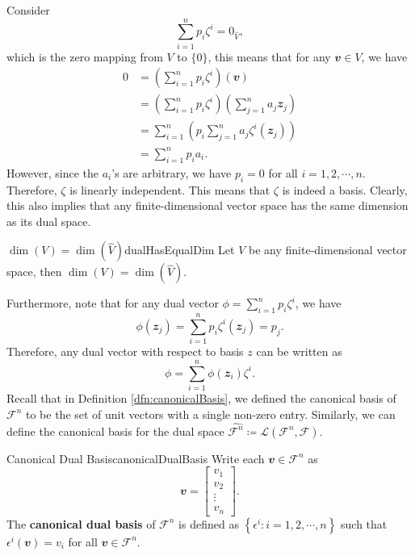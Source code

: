 \documentclass[math, code]{amznotes}
\theoremstyle{remark}
\begin{document}
Consider
\begin{equation*}
    \sum_{i = 1}^{n}p_i\zeta^i = 0_{\hat{V}},
\end{equation*}
which is the zero mapping from $V$ to $\{0\}$, this means that for any $\mathbfit{v} \in V$, we have
\begin{align*}
    0 & = \left(\sum_{i = 1}^{n}p_i\zeta^i\right)(\mathbfit{v}) \\
    & = \left(\sum_{i = 1}^{n}p_i\zeta^i\right)\left(\sum_{j = 1}^{n}a_j\mathbfit{z}_j\right) \\
    & = \sum_{i = 1}^{n}\left(p_i\sum_{j = 1}^{n}a_j\zeta^i(\mathbfit{z}_j)\right) \\
    & = \sum_{i = 1}^{n}p_ia_i.
\end{align*}
However, since the $a_i$'s are arbitrary, we have $p_i = 0$ for all $i = 1, 2, \cdots, n$. Therefore, $\zeta$ is linearly independent. This means that $\zeta$ is indeed a basis. Clearly, this also implies that any finite-dimensional vector space has the same dimension as its dual space. 
\begin{probox}{$\dim(V) = \dim\left(\hat{V}\right)$}{dualHasEqualDim}
    Let $V$ be any finite-dimensional vector space, then $\dim(V) = \dim\left(\hat{V}\right)$.
\end{probox}
Furthermore, note that for any dual vector $\phi = \sum_{i = 1}^{n}p_i\zeta^i$, we have
\begin{equation*}
    \phi(\mathbfit{z}_j) = \sum_{i = 1}^{n}p_i\zeta^i(\mathbfit{z}_j) = p_j.
\end{equation*}
Therefore, any dual vector with respect to basis $z$ can be written as
\begin{equation*}
    \phi = \sum_{i = 1}^{n}\phi(\mathbfit{z}_i)\zeta^i.
\end{equation*}
Recall that in Definition \ref{dfn:canonicalBasis}, we defined the canonical basis of $\mathcal{F}^n$ to be the set of unit vectors with a single non-zero entry. Similarly, we can define the canonical basis for the dual space $\hat{\mathcal{F}^n} \coloneqq \mathcal{L}(\mathcal{F}^n, \mathcal{F})$.
\begin{dfnbox}{Canonical Dual Basis}{canonicalDualBasis}
    Write each $\mathbfit{v} \in \mathcal{F}^n$ as
    \begin{equation*}
        \mathbfit{v} = \begin{bmatrix}
            v_1 \\
            v_2 \\
            \vdots \\
            v_n
        \end{bmatrix}.
    \end{equation*}
    The {\color{red} \textbf{canonical dual basis}} of $\mathcal{F}^n$ is defined as $\left\{\epsilon^i \colon i = 1, 2, \cdots, n\right\}$ such that $\epsilon^i(\mathbfit{v}) = v_i$ for all $\mathbfit{v} \in \mathcal{F}^n$.
\end{dfnbox}
\end{document}
